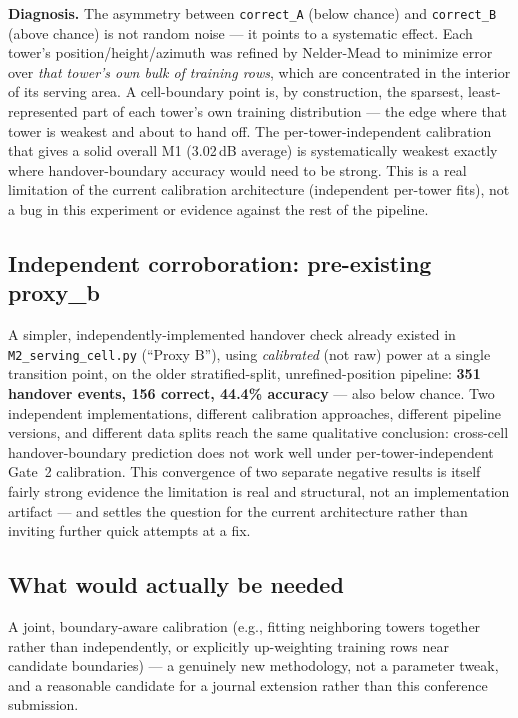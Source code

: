 \documentclass[11pt]{article}
\begin{document}
\textbf{Diagnosis.} The asymmetry between \texttt{correct\_A} (below
chance) and \texttt{correct\_B} (above chance) is not random noise — it
points to a systematic effect. Each tower's position/height/azimuth was
refined by Nelder-Mead to minimize error over \emph{that tower's own
bulk of training rows}, which are concentrated in the interior of its
serving area. A cell-boundary point is, by construction, the sparsest,
least-represented part of each tower's own training distribution — the
edge where that tower is weakest and about to hand off. The
per-tower-independent calibration that gives a solid overall M1 (3.02\,dB
average) is systematically weakest exactly where handover-boundary
accuracy would need to be strong. This is a real limitation of the
current calibration architecture (independent per-tower fits), not a
bug in this experiment or evidence against the rest of the pipeline.

\subsection{Independent corroboration: pre-existing proxy\_b}
A simpler, independently-implemented handover check already existed in
\texttt{M2\_serving\_cell.py} (``Proxy B''), using \emph{calibrated}
(not raw) power at a single transition point, on the older stratified-split,
unrefined-position pipeline: \textbf{351 handover events, 156 correct,
44.4\% accuracy} — also below chance. Two independent implementations,
different calibration approaches, different pipeline versions, and
different data splits reach the same qualitative conclusion: cross-cell
handover-boundary prediction does not work well under
per-tower-independent Gate~2 calibration. This convergence of two
separate negative results is itself fairly strong evidence the limitation
is real and structural, not an implementation artifact — and settles the
question for the current architecture rather than inviting further quick
attempts at a fix.

\subsection{What would actually be needed}
A joint, boundary-aware calibration (e.g., fitting neighboring towers
together rather than independently, or explicitly up-weighting training
rows near candidate boundaries) — a genuinely new methodology, not a
parameter tweak, and a reasonable candidate for a journal extension
rather than this conference submission.
\end{document}
